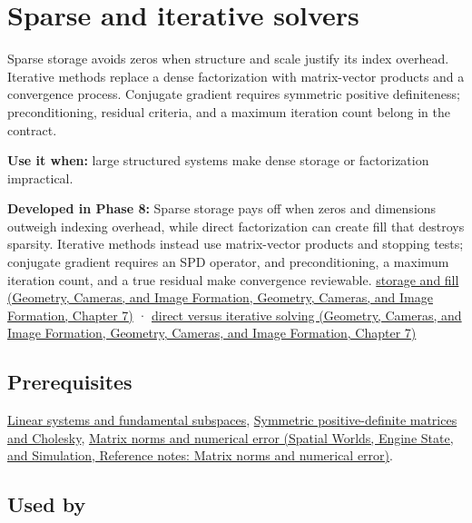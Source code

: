 \hypertarget{appendix-67c87a3d9e94}{}\label{referencestart:appendix-67c87a3d9e94}
\section{Sparse and iterative solvers}\label{appendix-67c87a3d9e94-sparse-and-iterative-solvers}

Sparse storage avoids zeros when structure and scale justify its index overhead. Iterative methods replace a dense factorization with matrix-vector products and a convergence process. Conjugate gradient requires symmetric positive definiteness; preconditioning, residual criteria, and a maximum iteration count belong in the contract.

\textbf{Use it when:} large structured systems make dense storage or factorization impractical.

\textbf{Developed in Phase 8:} Sparse storage pays off when zeros and dimensions outweigh indexing overhead, while direct factorization can create fill that destroys sparsity. Iterative methods instead use matrix-vector products and stopping tests; conjugate gradient requires an SPD operator, and preconditioning, a maximum iteration count, and a true residual make convergence reviewable. \href{../03-Geometry-Cameras-and-Image-Formation/main.pdf\#nameddest=02-foundations-ii-ch038-sparse-storage-changes-the-cost-model}{storage and fill (Geometry, Cameras, and Image Formation, Geometry, Cameras, and Image Formation, Chapter 7)} · \href{../03-Geometry-Cameras-and-Image-Formation/main.pdf\#nameddest=02-foundations-ii-ch038-direct-and-iterative-solvers-suit-different-workloads}{direct versus iterative solving (Geometry, Cameras, and Image Formation, Geometry, Cameras, and Image Formation, Chapter 7)}

\subsection{Prerequisites}\label{appendix-67c87a3d9e94-prerequisites}

\hyperref[appendix-8572a4a060c1]{Linear systems and fundamental subspaces}, \hyperref[appendix-50d2ea3c9b26]{Symmetric positive-definite matrices and Cholesky}, \href{../05-Spatial-Worlds-Engine-State-and-Simulation/main.pdf\#nameddest=appendix-f8657bac66e5}{Matrix norms and numerical error (Spatial Worlds, Engine State, and Simulation, Reference notes: Matrix norms and numerical error)}.

\subsection{Used by}\label{appendix-67c87a3d9e94-used-by}

